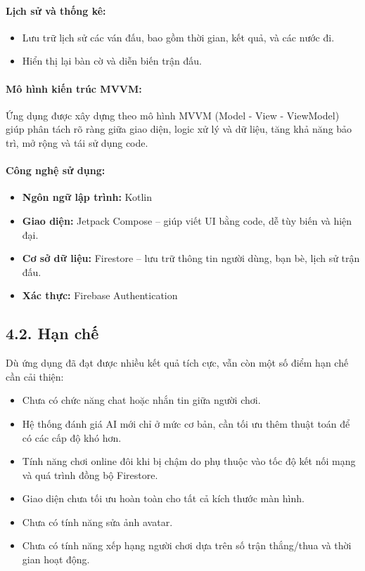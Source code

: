 \documentclass[a4paper,12pt]{article}
\begin{document}
\paragraph{\textbf{Lịch sử và thống kê:}} %
\begin{itemize}[label=·]
    \item Lưu trữ lịch sử các ván đấu, bao gồm thời gian, kết quả, và các nước đi.
    \item Hiển thị lại bàn cờ và diễn biến trận đấu.
\end{itemize}

\paragraph{\textbf{Mô hình kiến trúc MVVM:}} %
\noindent Ứng dụng được xây dựng theo mô hình MVVM (Model - View - ViewModel) giúp phân tách rõ ràng giữa giao diện, logic xử lý và dữ liệu, tăng khả năng bảo trì, mở rộng và tái sử dụng code.

\paragraph{\textbf{Công nghệ sử dụng:}} %
\begin{itemize}[label=·]
    \item \textbf{Ngôn ngữ lập trình:} Kotlin
    \item \textbf{Giao diện:} Jetpack Compose – giúp viết UI bằng code, dễ tùy biến và hiện đại.
    \item \textbf{Cơ sở dữ liệu:} Firestore – lưu trữ thông tin người dùng, bạn bè, lịch sử trận đấu.
    \item \textbf{Xác thực:} Firebase Authentication
\end{itemize}

\subsection*{4.2. Hạn chế} %

\justify
\noindent Dù ứng dụng đã đạt được nhiều kết quả tích cực, vẫn còn một số điểm hạn chế cần cải thiện:
\begin{itemize}[label=·]
    \item Chưa có chức năng chat hoặc nhắn tin giữa người chơi.
    \item Hệ thống đánh giá AI mới chỉ ở mức cơ bản, cần tối ưu thêm thuật toán để có các cấp độ khó hơn.
    \item Tính năng chơi online đôi khi bị chậm do phụ thuộc vào tốc độ kết nối mạng và quá trình đồng bộ Firestore.
    \item Giao diện chưa tối ưu hoàn toàn cho tất cả kích thước màn hình.
    \item Chưa có tính năng sửa ảnh avatar.
    \item Chưa có tính năng xếp hạng người chơi dựa trên số trận thắng/thua và thời gian hoạt động.
\end{itemize}
\end{document}
